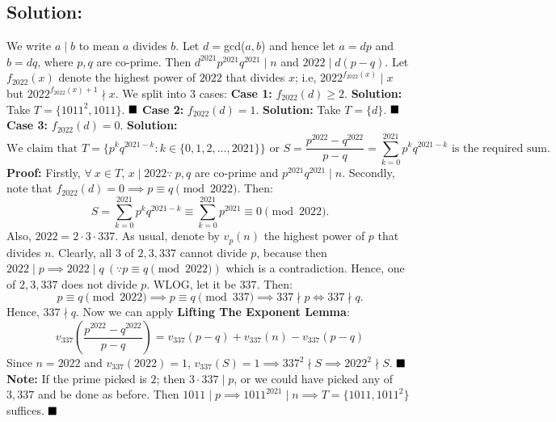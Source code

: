 \documentclass[fontsize=9pt]{scrartcl}
\begin{document}
	\subsection*{Solution:}
	We write $a \mid b$ to mean $a$ divides $b$.
	\newline
	Let $d=$gcd($a,b$) and hence let $a=dp$ and $b=dq$, where $p,q$ are co-prime.
        Then $d^{2021}p^{2021}q^{2021} \mid n$ and $2022 \mid d(p-q)$. \newline \newline
        Let $f_{2022}(x)$ denote the highest power of $2022$ that divides $x$; i.e, $2022^{f_{2022}(x)} \mid x$ but 
        $2022^{f_{2022}(x) + 1} \nmid x$. We split into $3$ cases: \newline \newline
        \textbf{Case 1:} $f_{2022}(d) \ge 2$. \newline
        \textbf{Solution:} Take $T = \{1011^2, 1011 \}$. $\hfill \blacksquare$ \newline \newline
        \textbf{Case 2:} $f_{2022}(d) = 1$. \newline
        \textbf{Solution:} Take $T = \{d \}$. $\hfill \blacksquare$ \newline \newline
        \textbf{Case 3:} $f_{2022}(d) = 0$. \newline
        \textbf{Solution:} 
        \[ \text{We claim that } T=\{p^kq^{2021-k} \colon k \in \{0,1, 2, \dots, 2021 \} \} \text{ or } S=\frac{p^{2022}-q^{2022}}{p-q} = \sum_{k=0}^{2021} p^kq^{2021-k} \text{ is the required sum.}\]
        \textbf{Proof:} \newline 
        Firstly, $\forall \ x \in T$, $x \mid 2022 \because \ p,q$ are co-prime and $p^{2021}q^{2021} \mid n$. \newline
        Secondly, note that $f_{2022}(d) = 0 \implies p \equiv q \pmod{2022}$. Then: \[S=\sum_{k=0}^{2021} p^kq^{2021-k} \equiv \sum_{k=0}^{2021}p^{2021} \equiv0 \pmod{2022}.\]
        Also, $2022 = 2 \cdot 3 \cdot 337$. As usual, denote by $v_p(n)$ the highest power of $p$ that divides $n$.
        Clearly, all $3$ of $2,3,337$ cannot divide $p$, because then $2022 \mid p \implies 2022 \mid q \ (\because p \equiv q \pmod{2022})$ which is a contradiction.
        Hence, one of $2,3,337$ does not divide $p$. WLOG, let it be $337$. Then:
         \[p \equiv q \pmod{2022} \implies p\equiv q \pmod{337} \implies 337 \nmid p \iff 337 \nmid q.\]
         Hence, $337 \nmid q$.  Now we can apply \textbf{Lifting The Exponent Lemma}:  \[ v_{337}\left(\frac{p^{2022} - q^{2022}}{p-q} \right) = v_{337}(p-q)+v_{337}(n) - v_{337}(p-q) \]
         Since $n=2022$ and $v_{337}(2022) = 1$, $v_{337}(S) = 1 \implies 337^2 \nmid S \implies 2022^2 \nmid S$. $\hfill \blacksquare$ \newline \newline
         \textbf{Note:} If the prime picked is $2$; then $3 \cdot 337 \mid p$, or we could have picked any of $3, 337$ and be done as before.
         Then $1011 \mid p \implies 1011^{2021} \mid n \implies T= \{1011, 1011^2\}$ suffices. $\hfill \blacksquare$
         
\end{document}
